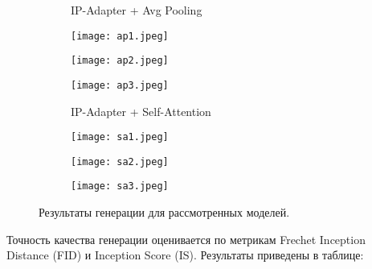 \documentclass{article}
\begin{document}
\begin{figure}[H]
\vspace{-25pt}

\begin{figure}[H]
\begin{minipage}{.25\textwidth}
    \centering
    IP-Adapter + Avg Pooling
    \label{fig:mp0}
\end{minipage}%
\begin{minipage}{.25\textwidth}
    \centering
    \texttt{[image: ap1.jpeg]}
    \label{fig:ap1}
\end{minipage}%
\begin{minipage}{.25\textwidth}
    \centering
    \texttt{[image: ap2.jpeg]}
    \label{fig:ap2}
\end{minipage}%
\begin{minipage}{.25\textwidth}
    \centering
    \texttt{[image: ap3.jpeg]}
    \label{fig:ap3}
\end{minipage}%
\end{figure}

\vspace{-25pt}

\begin{figure}[H]
\begin{minipage}{.25\textwidth}
    \centering
    IP-Adapter + Self-Attention
    \label{fig:sa0}
\end{minipage}%
\begin{minipage}{.25\textwidth}
    \centering
    \texttt{[image: sa1.jpeg]}
    \label{fig:sa1}
\end{minipage}%
\begin{minipage}{.25\textwidth}
    \centering
    \texttt{[image: sa2.jpeg]}
    \label{fig:sa2}
\end{minipage}%
\begin{minipage}{.25\textwidth}
    \centering
    \texttt{[image: sa3.jpeg]}
    \label{fig:sa3}
\end{minipage}%
\end{figure}
\caption{Результаты генерации для рассмотренных моделей.}
\end{figure}

Точность качества генерации оценивается по метрикам Frechet Inception Distance (FID) и Inception Score (IS). Результаты приведены в таблице: 
\end{document}
